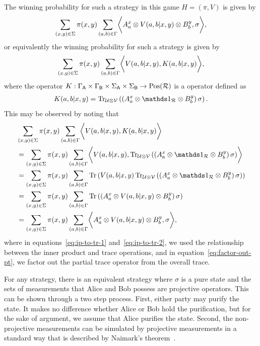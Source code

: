 The winning probability for such a strategy in this game $H = (\pi,V)$ is given by 
\begin{align} \label{eq:enlg-quantum-winning-probability}
	\sum_{(x,y) \in \Sigma} \pi(x,y) \sum_{(a,b) \in \Gamma} \biggl\langle A_a^x \otimes V(a,b|x,y) \otimes B_b^y, \sigma \biggr\rangle,
\end{align}  
or equivalently the winning probability for such a strategy is given by 
\begin{align}
	\sum_{(x,y) \in \Sigma} \pi(x,y) \sum_{(a,b) \in \Gamma} \biggl\langle V(a,b|x,y), K(a,b|x,y) \biggr\rangle,
\end{align}
where the operator $K : \Gamma_{\mathsf{A}} \times \Gamma_{\mathsf{B}} \times \Sigma_{\mathsf{A}} \times \Sigma_{\mathsf{B}} \rightarrow \mathrm{Pos}(\mathcal{R})$ is a  operator defined as 
\begin{align}
	K(a,b|x,y) = \tr_{\U \otimes \V} \left( \left( A_a^x \otimes \I_{\R} \otimes B_b^y \right) \sigma \right).
\end{align}
This may be observed by noting that 
\begin{align}
	 &\sum_{(x,y) \in \Sigma} \pi(x,y) \sum_{(a,b) \in \Gamma} \biggip{V(a,b|x,y)}{K(a,b|x,y)} \\
	 &=\sum_{(x,y) \in \Sigma} \pi(x,y) \sum_{(a,b) \in \Gamma} \biggip{V(a,b|x,y)}{\tr_{\U \otimes \V} \left( \left(  A_a^x \otimes \I_{\R} \otimes B_b^y \right) \sigma \right)} \\
	 &=\sum_{(x,y) \in \Sigma} \pi(x,y) \sum_{(a,b) \in \Gamma} \tr \left( V(a,b|x,y) \tr_{\U \otimes \V} \left( \left( A_a^x \otimes \I_{\R} \otimes B_b^y \right) \sigma \right) \right)  \label{eq:ip-to-tr-1} \\
	 &=\sum_{(x,y) \in \Sigma} \pi(x,y) \sum_{(a,b) \in \Gamma} \tr \left( \left( A_a^x \otimes V(a,b|x,y) \otimes B_b^y \right) \sigma \right) \label{eq:factor-out-pt} \\
	 &=\sum_{(x,y) \in \Sigma} \pi(x,y) \sum_{(a,b) \in \Gamma} \biggip{ A_a^x \otimes V(a,b|x,y) \otimes B_b^y}{\sigma}, \label{eq:ip-to-tr-2} 
\end{align}
where in equations~\eqref{eq:ip-to-tr-1} and~\eqref{eq:ip-to-tr-2}, we used the relationship between the inner product and trace operations, and in equation~\eqref{eq:factor-out-pt}, we factor out the partial trace operator from the overall trace. 

For any strategy, there is an equivalent strategy where $\sigma$ is a pure state and the sets of measurements that Alice and Bob possess are projective operators. This can be shown through a two step process. First, either party may purify the state. It makes no difference whether Alice or Bob hold the purification, but for the sake of argument, we assume that Alice purifies the state. Second, the non-projective measurements can be simulated by projective measurements in a standard way that is described by Naimark's theorem~\cite{Paulsen2003}. 


